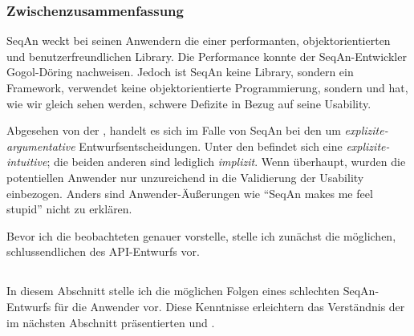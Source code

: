 \subsubsection{Zwischenzusammenfassung} SeqAn weckt bei seinen Anwendern die  einer performanten, objektorientierten und benutzerfreundlichen Library. Die Performance konnte der SeqAn-Entwickler Gogol-Döring nachweisen. Jedoch ist SeqAn keine Library, sondern ein Framework, verwendet keine objektorientierte Programmierung, sondern  und hat, wie wir gleich sehen werden, schwere Defizite in Bezug auf seine Usability.

Abgesehen von der , handelt es sich im Falle von SeqAn bei den  um \textit{explizite-argumentative} Entwurfsentscheidungen. Unter den  befindet sich eine \textit{explizite-intuitive}; die beiden anderen sind lediglich \textit{implizit}. Wenn überhaupt, wurden die potentiellen Anwender nur unzureichend in die Validierung der Usability einbezogen. Anders sind Anwender-Äußerungen wie ``SeqAn makes me feel stupid'' nicht zu erklären.

Bevor ich die beobachteten  genauer vorstelle, stelle ich zunächst die möglichen, schlussendlichen  des API-Entwurfs vor.


\subsection[Folgen]{}

In diesem Abschnitt stelle ich die möglichen Folgen eines schlechten SeqAn-Entwurfs für die Anwender vor. Diese Kenntnisse erleichtern das Verständnis der im nächsten Abschnitt präsentierten  und .

